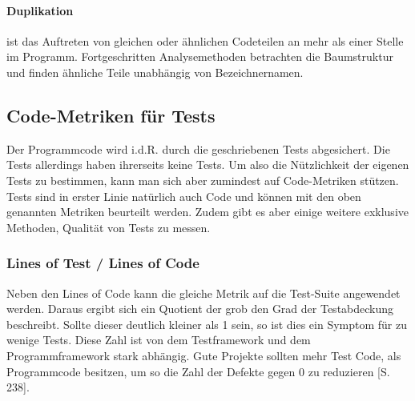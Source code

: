 \paragraph{Duplikation} ist das Auftreten von gleichen oder ähnlichen Codeteilen an mehr als einer Stelle im Programm. Fortgeschritten Analysemethoden betrachten die Baumstruktur und finden ähnliche Teile unabhängig von Bezeichnernamen.

\subsection{Code-Metriken für Tests}
\label{sec:metrics}
Der Programmcode wird i.d.R. durch die geschriebenen Tests abgesichert. Die Tests allerdings haben ihrerseits keine Tests. Um also die Nützlichkeit der eigenen Tests zu bestimmen, kann man sich aber zumindest auf Code-Metriken stützen.
Tests sind in erster Linie natürlich auch Code und können mit den oben genannten Metriken beurteilt werden. Zudem gibt es aber einige weitere exklusive Methoden, Qualität von Tests zu messen. 

\subsubsection{Lines of Test / Lines of Code}
Neben den Lines of Code kann die gleiche Metrik auf die Test-Suite angewendet werden. Daraus ergibt sich ein Quotient der grob den Grad der Testabdeckung beschreibt. Sollte dieser deutlich kleiner als 1 sein, so ist dies ein Symptom für zu wenige Tests. Diese Zahl ist von dem Testframework und dem Programmframework stark abhängig. Gute Projekte sollten mehr Test Code, als Programmcode besitzen, um so die Zahl der Defekte gegen 0 zu reduzieren \citep{hunt_pragmatic_1999}[S. 238]. 
        
